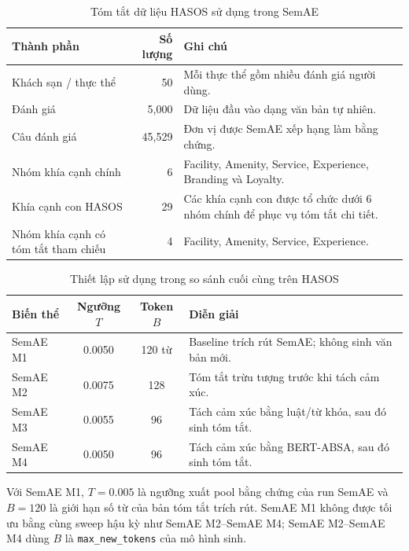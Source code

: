 
\begin{table}[H]
\centering
\caption{Tóm tắt dữ liệu HASOS sử dụng trong SemAE}
\label{tab:hasos-data-summary}
\begin{tabularx}{0.92\textwidth}{l r X}
\toprule
\textbf{Thành phần} & \textbf{Số lượng} & \textbf{Ghi chú} \\
\midrule
Khách sạn / thực thể & 50 & Mỗi thực thể gồm nhiều đánh giá người dùng. \\
Đánh giá & 5,000 & Dữ liệu đầu vào dạng văn bản tự nhiên. \\
Câu đánh giá & 45,529 & Đơn vị được SemAE xếp hạng làm bằng chứng. \\
Nhóm khía cạnh chính & 6 & Facility, Amenity, Service, Experience, Branding và Loyalty. \\
Khía cạnh con HASOS & 29 & Các khía cạnh con được tổ chức dưới 6 nhóm chính để phục vụ tóm tắt chi tiết. \\
Nhóm khía cạnh có tóm tắt tham chiếu & 4 & Facility, Amenity, Service, Experience. \\
\bottomrule
\end{tabularx}
\end{table}

\begin{table}[H]
\centering
\caption{Thiết lập sử dụng trong so sánh cuối cùng trên HASOS}
\label{tab:optimal-settings}
\begin{threeparttable}
\begin{tabular}{l c c l}
\toprule
\textbf{Biến thể} & \textbf{Ngưỡng $T$} & \textbf{Token $B$} & \textbf{Diễn giải} \\
\midrule
SemAE M1 & 0.0050 & 120 từ & Baseline trích rút SemAE; không sinh văn bản mới. \\
SemAE M2 & 0.0075 & 128 & Tóm tắt trừu tượng trước khi tách cảm xúc. \\
SemAE M3 & 0.0055 & 96 & Tách cảm xúc bằng luật/từ khóa, sau đó sinh tóm tắt. \\
SemAE M4 & 0.0050 & 96 & Tách cảm xúc bằng BERT-ABSA, sau đó sinh tóm tắt. \\
\bottomrule
\end{tabular}
\begin{tablenotes}
\footnotesize
\item Với SemAE M1, \(T=0.005\) là ngưỡng xuất pool bằng chứng của run SemAE và \(B=120\) là giới hạn số từ của bản tóm tắt trích rút. SemAE M1 không được tối ưu bằng cùng sweep hậu kỳ như SemAE M2--SemAE M4; SemAE M2--SemAE M4 dùng \(B\) là \texttt{max\_new\_tokens} của mô hình sinh.
\end{tablenotes}
\end{threeparttable}
\end{table}

